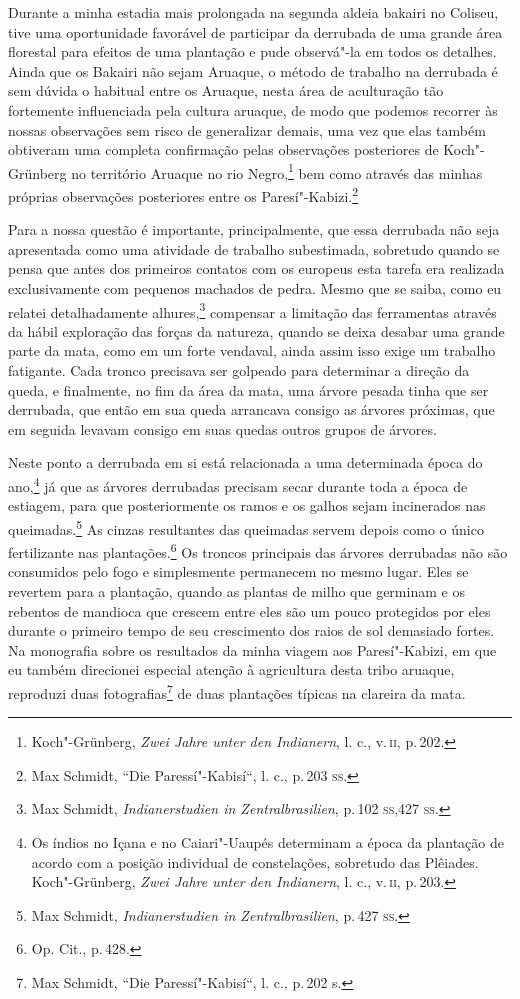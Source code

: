 Durante a minha estadia mais prolongada na segunda aldeia bakairi no
Coliseu, tive uma oportunidade favorável de participar da derrubada de
uma grande área florestal para efeitos de uma plantação e pude
observá"-la em todos os detalhes. Ainda que os Bakairi não sejam Aruaque,
o método de trabalho na derrubada é sem dúvida o habitual entre os
Aruaque, nesta área de aculturação tão fortemente influenciada pela
cultura aruaque, de modo que podemos recorrer às nossas observações sem
risco de generalizar demais, uma vez que elas também obtiveram uma
completa confirmação pelas observações posteriores de Koch"-Grünberg no
território Aruaque no rio Negro,\footnote{Koch"-Grünberg, \textit{Zwei Jahre
  unter den Indianern}, l. c., v.\,\textsc{ii}, p.\,202.} bem como através das
minhas próprias observações posteriores entre os Paresí"-Kabizi.\footnote{Max
  Schmidt, ``Die Paressí"-Kabisí``, l. c., p.\,203 \textsc{ss}.}

Para a nossa questão é importante, principalmente, que essa derrubada
não seja apresentada como uma atividade de trabalho subestimada,
sobretudo quando se pensa que antes dos primeiros contatos com os
europeus esta tarefa era realizada exclusivamente com pequenos machados
de pedra. Mesmo que se saiba, como eu relatei detalhadamente
alhures,\footnote{Max Schmidt, \textit{Indianerstudien in
  Zentralbrasilien}, p.\,102 \textsc{ss},427 \textsc{ss}.} compensar a limitação das
ferramentas através da hábil exploração das forças da natureza, quando
se deixa desabar uma grande parte da mata, como em um forte vendaval,
ainda assim isso exige um trabalho fatigante. Cada tronco precisava ser
golpeado para determinar a direção da queda, e finalmente, no fim da
área da mata, uma árvore pesada tinha que ser derrubada, que então em
sua queda arrancava consigo as árvores próximas, que em seguida levavam
consigo em suas quedas outros grupos de árvores.

Neste ponto a derrubada em si está relacionada a uma determinada época
do ano,\footnote{Os índios no Içana e no Caiari"-Uaupés determinam a época
  da plantação de acordo com a posição individual de constelações,
  sobretudo das Plêiades. Koch"-Grünberg, \textit{Zwei Jahre unter den
  Indianern}, l. c., v.\,\textsc{ii}, p.\,203.} já que as árvores derrubadas
precisam secar durante toda a época de estiagem, para que
posteriormente os ramos e os galhos sejam incinerados nas
queimadas.\footnote{Max Schmidt, \textit{Indianerstudien in
  Zentralbrasilien}, p.\,427 \textsc{ss}.} As cinzas resultantes das queimadas
servem depois como o único fertilizante nas plantações.\footnote{Op.
  Cit., p.\,428.} Os troncos principais das árvores derrubadas não são
consumidos pelo fogo e simplesmente permanecem no mesmo lugar. Eles se
revertem para a plantação, quando as plantas de milho que germinam e os
rebentos de mandioca que crescem entre eles são um pouco protegidos
por eles durante o primeiro tempo de seu crescimento dos raios de sol
demasiado fortes. Na monografia sobre os resultados da minha viagem aos
Paresí"-Kabizi, em que eu também direcionei especial atenção à
agricultura desta tribo aruaque, reproduzi duas fotografias\footnote{Max
  Schmidt, ``Die Paressí"-Kabisí``, l. c., p.\,202 s.} de duas plantações
típicas na clareira da mata.

